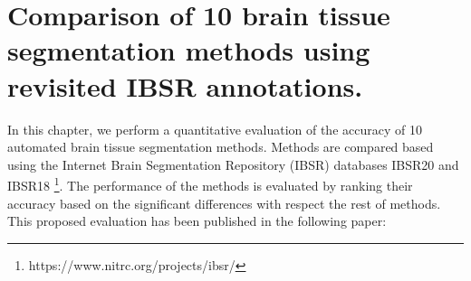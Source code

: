 
\chapter{Comparison of 10 brain tissue segmentation methods using revisited IBSR annotations.}  
\label{chapter:chapter_2}

In this chapter, we perform a quantitative evaluation of the accuracy of 10 automated brain tissue segmentation methods. Methods are compared based using the Internet Brain Segmentation Repository (IBSR) databases IBSR20 and IBSR18 \footnote{https://www.nitrc.org/projects/ibsr/}. The performance of the methods is evaluated by ranking their accuracy based on the significant differences with respect the rest of methods. This proposed evaluation has been published in the following paper:

\vspace{2cm}

\noindent{}





